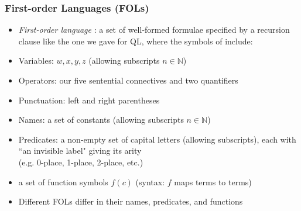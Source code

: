 \begin{frame}
\frametitle{First-order Languages (FOLs)}

\begin{itemize}[<+->]

\item \emph{First-order language }: a set of well-formed formulae specified by a recursion clause like the one we gave for QL, where the symbols of  include: 

\bi 


\item Variables: $w, x, y, z$ (allowing subscripts $n \in \mathbb{N}$) 
\item Operators: our five sentential connectives and two quantifiers
\item Punctuation: left and right parentheses
\item \textcolor{OGlyallpink}{Names}: a set of constants (allowing subscripts $n \in\mathbb{N}$)
\item \textcolor{OGlyallpink}{Predicates}: a non-empty set of capital letters (allowing subscripts), each with ``an invisible label" giving its arity \\ (e.g. 0-place, 1-place, 2-place, etc.) 
\item a set of \textcolor{OGlyallpink}{function} symbols $f(c)$ (syntax: $f$ maps terms to terms) 
\ei 

\item \textcolor{OGlyallpink}{Different} FOLs differ in their names, predicates, and functions

\end{itemize}
\end{frame}

